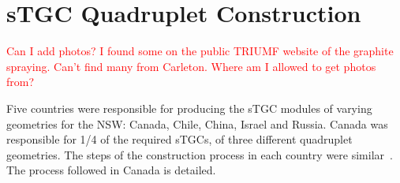 


\section{sTGC Quadruplet Construction}
\label{sec:stgc_construction}

\textcolor{red}{Can I add photos? I found some on the public TRIUMF website of the graphite spraying. Can't find many from Carleton. Where am I allowed to get photos from?}

Five countries were responsible for producing the sTGC modules of varying geometries for the NSW: Canada, Chile, China, Israel and Russia. Canada was responsible for 1/4 of the required sTGCs, of three different quadruplet geometries. The steps of the construction process in each country were similar~\cite{nsw_tdr}. The process followed in Canada is detailed.

